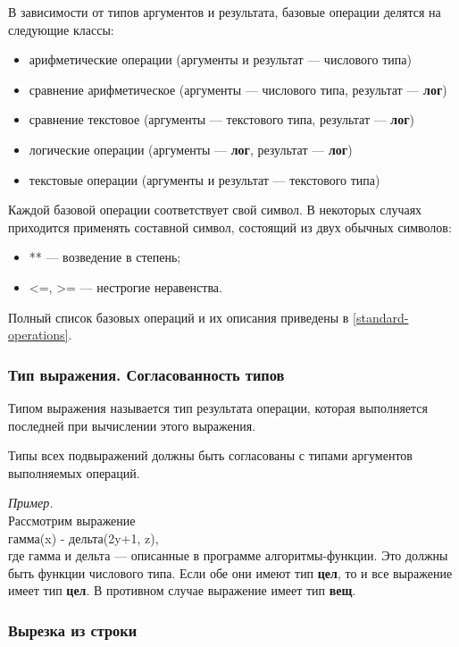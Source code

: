 \documentclass[12pt,a4paper]{article}
\begin{document}
	В зависимости от типов аргументов и результата, базовые операции делятся на следующие классы:
\begin{itemize}
\item арифметические операции (аргументы и результат --- числового типа)
\item сравнение арифметическое (аргументы --- числового типа, результат --- \textbf{лог})
\item сравнение текстовое (аргументы --- текстового типа, результат --- \textbf{лог})
\item логические операции (аргументы --- \textbf{лог}, результат --- \textbf{лог})
\item текстовые операции (аргументы и результат --- текстового типа)
\end{itemize}

	Каждой базовой операции соответствует свой символ. В некоторых случаях приходится применять составной символ, состоящий из двух обычных символов:
\begin{itemize}
\item \textsf{**} --- возведение в степень;
\item \textsf{<=}, \textsf{>=} --- нестрогие неравенства.
\end{itemize}

	Полный список базовых операций и их описания приведены в \ref{standard-operations}.
			
\subsubsection{Тип выражения. Согласованность типов}

Типом выражения называется тип результата операции, которая выполняется последней при вычислении этого выражения.

Типы всех подвыражений должны быть согласованы с типами аргументов выполняемых операций.

\emph{Пример.}\\
Рассмотрим выражение\\
\textsf{гамма(x) - дельта(2y+1, z)},\\
где \textsf{гамма} и \textsf{дельта} --- описанные в программе алгоритмы-функции. Это должны быть функции числового типа. Если обе они имеют тип \textbf{цел}, то и все выражение имеет тип \textbf{цел}. В противном случае выражение имеет тип \textbf{вещ}.

\subsubsection{Вырезка из строки}
\end{document}

